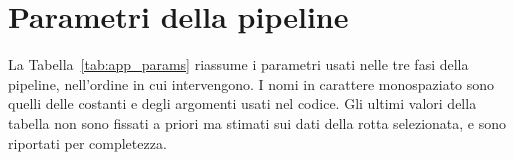 
\chapter{Parametri della pipeline}\label{app:params}

La Tabella~\ref{tab:app_params} riassume i parametri usati nelle tre fasi della pipeline, nell'ordine
in cui intervengono. I nomi in carattere monospaziato sono quelli delle costanti e degli argomenti
usati nel codice. Gli ultimi valori della tabella non sono fissati a priori ma stimati sui dati della
rotta selezionata, e sono riportati per completezza.

